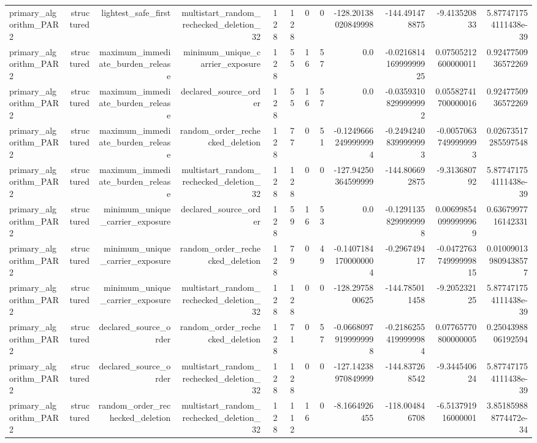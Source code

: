 {\begin{longtable}{lrrrrrrrrrrr}
primary\_algorithm\_PAR2 & structured & lightest\_safe\_first & multistart\_random\_rechecked\_deletion\_32 & 128 & 128 & 0 & 0 & -128.20138020849998 & -144.491478875 & -9.413520833 & 5.877471754111438e-39 \\
primary\_algorithm\_PAR2 & structured & maximum\_immediate\_burden\_release & minimum\_unique\_carrier\_exposure & 128 & 55 & 16 & 57 & 0.0 & -0.021681416999999925 & 0.07505212600000011 & 0.9247750936572269 \\
primary\_algorithm\_PAR2 & structured & maximum\_immediate\_burden\_release & declared\_source\_order & 128 & 55 & 16 & 57 & 0.0 & -0.03593108299999992 & 0.05582741700000016 & 0.9247750936572269 \\
primary\_algorithm\_PAR2 & structured & maximum\_immediate\_burden\_release & random\_order\_rechecked\_deletion & 128 & 77 & 0 & 51 & -0.12496662499999994 & -0.24942408399999993 & -0.00570637499999993 & 0.02673517285597548 \\
primary\_algorithm\_PAR2 & structured & maximum\_immediate\_burden\_release & multistart\_random\_rechecked\_deletion\_32 & 128 & 128 & 0 & 0 & -127.94250364599999 & -144.806692875 & -9.313680792 & 5.877471754111438e-39 \\
primary\_algorithm\_PAR2 & structured & minimum\_unique\_carrier\_exposure & declared\_source\_order & 128 & 59 & 16 & 53 & 0.0 & -0.12911358299999998 & 0.006998540999999969 & 0.6367997716142331 \\
primary\_algorithm\_PAR2 & structured & minimum\_unique\_carrier\_exposure & random\_order\_rechecked\_deletion & 128 & 79 & 0 & 49 & -0.14071841700000004 & -0.296749417 & -0.047276374999999815 & 0.010090139809438577 \\
primary\_algorithm\_PAR2 & structured & minimum\_unique\_carrier\_exposure & multistart\_random\_rechecked\_deletion\_32 & 128 & 128 & 0 & 0 & -128.2975800625 & -144.785011458 & -9.205232125 & 5.877471754111438e-39 \\
primary\_algorithm\_PAR2 & structured & declared\_source\_order & random\_order\_rechecked\_deletion & 128 & 71 & 0 & 57 & -0.06680979199999998 & -0.21862554199999984 & 0.07765770800000005 & 0.2504398806192594 \\
primary\_algorithm\_PAR2 & structured & declared\_source\_order & multistart\_random\_rechecked\_deletion\_32 & 128 & 128 & 0 & 0 & -127.14238970849999 & -144.837268542 & -9.344540624 & 5.877471754111438e-39 \\
primary\_algorithm\_PAR2 & structured & random\_order\_rechecked\_deletion & multistart\_random\_rechecked\_deletion\_32 & 128 & 112 & 16 & 0 & -8.1664926455 & -118.004846708 & -6.513791916000001 & 3.851859888774472e-34 \\

\end{longtable}}
